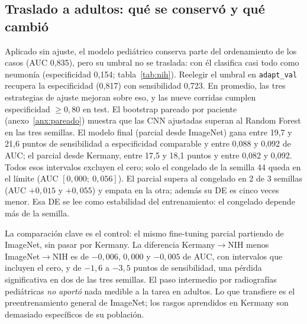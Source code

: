 \documentclass[11pt]{article}
\begin{document}
\begin{table}[h]\centering\small
\caption{Brecha frente a \citet{rahman2020}: fine-tuning parcial, media $\pm$ DE de tres semillas en el test de Kermany. El umbral 0,5 y la columna final son lecturas descriptivas del test; el umbral oficial no cambia.}\label{tab:replica}
\resizebox{\textwidth}{!}{}
\end{table}

\subsection{Traslado a adultos: qué se conservó y qué cambió}
Aplicado sin ajuste, el modelo pediátrico conserva parte del ordenamiento de los casos (AUC 0,835), pero su umbral no se traslada: con él clasifica casi todo como neumonía (especificidad 0,154; tabla~\ref{tab:nih}). Reelegir el umbral en \texttt{adapt\_val} recupera la especificidad (0,817) con sensibilidad 0,723. En promedio, las tres estrategias de ajuste mejoran sobre eso, y las nueve corridas cumplen especificidad $\geq0{,}80$ en test. El bootstrap pareado por paciente (anexo~\ref{anx:pareado}) muestra que las CNN ajustadas superan al Random Forest en las tres semillas. El modelo final (parcial desde ImageNet) gana entre 19,7 y 21,6 puntos de sensibilidad a especificidad comparable y entre 0,088 y 0,092 de AUC; el parcial desde Kermany, entre 17,5 y 18,1 puntos y entre 0,082 y 0,092. Todos esos intervalos excluyen el cero; solo el congelado de la semilla 44 queda en el límite (AUC $[0{,}000;\ 0{,}056]$). El parcial supera al congelado en 2 de 3 semillas (AUC $+0{,}015$ y $+0{,}055$) y empata en la otra; además su DE es cinco veces menor. Esa DE se lee como estabilidad del entrenamiento: el congelado depende más de la semilla.

\begin{table}[h]\centering\small
\caption{Resultados en \texttt{external\_test} de NIH (1.484 imágenes): media $\pm$ DE de tres semillas. La última columna cuenta las corridas cuya especificidad puntual alcanza 0,80.}\label{tab:nih}
\resizebox{\textwidth}{!}{}
\end{table}

La comparación clave es el control: el mismo fine-tuning parcial partiendo de ImageNet, sin pasar por Kermany. La diferencia Kermany$\rightarrow$NIH menos ImageNet$\rightarrow$NIH es de $-0{,}006$, $0{,}000$ y $-0{,}005$ de AUC, con intervalos que incluyen el cero, y de $-1{,}6$ a $-3{,}5$ puntos de sensibilidad, una pérdida significativa en dos de las tres semillas. El paso intermedio por radiografías pediátricas \emph{no aportó} nada medible a la tarea en adultos. Lo que transfiere es el preentrenamiento general de ImageNet; los rasgos aprendidos en Kermany son demasiado específicos de su población.
\end{document}
